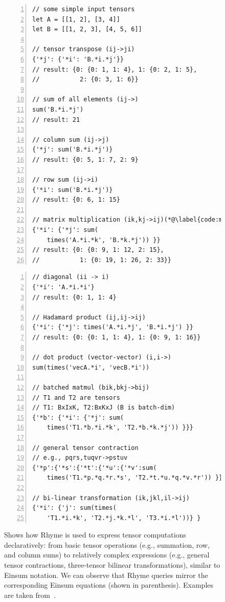 \documentclass[runningheads]{llncs}
\newcommand{\lang}{Rhyme}
\begin{document}

\begin{figure}[t]
\begin{minipage}{0.5\textwidth}
\begin{lstlisting}[style=JavaScript, columns=flexible, numbers=left]
// some simple input tensors
let A = [[1, 2], [3, 4]]
let B = [[1, 2, 3], [4, 5, 6]]

// tensor transpose (ij->ji)
{'*j': {'*i': 'B.*i.*j'}}
// result: {0: {0: 1, 1: 4}, 1: {0: 2, 1: 5},
//           2: {0: 3, 1: 6}}

// sum of all elements (ij->)
sum('B.*i.*j')
// result: 21

// column sum (ij->j)
{'*j': sum('B.*i.*j')}
// result: {0: 5, 1: 7, 2: 9}

// row sum (ij->i)
{'*i': sum('B.*i.*j')}
// result: {0: 6, 1: 15}

// matrix multiplication (ik,kj->ij)(*@\label{code:matmulquery}@*)
{'*i': {'*j': sum(
    times('A.*i.*k', 'B.*k.*j')) }}
// result: {0: {0: 9, 1: 12, 2: 15},
//           1: {0: 19, 1: 26, 2: 33}}
\end{lstlisting}
\end{minipage}
\begin{minipage}{0.5\textwidth}
\begin{lstlisting}[style=JavaScript, columns=flexible, numbers=left, firstnumber=last]
// diagonal (ii -> i)
{'*i': 'A.*i.*i'}
// result: {0: 1, 1: 4}

// Hadamard product (ij,ij->ij)
{'*i': {'*j': times('A.*i.*j', 'B.*i.*j') }}
// result: {0: {0: 1, 1: 4}, 1: {0: 9, 1: 16}}

// dot product (vector-vector) (i,i->)
sum(times('vecA.*i', 'vecB.*i'))

// batched matmul (bik,bkj->bij)
// T1 and T2 are tensors
// T1: BxIxK, T2:BxKxJ (B is batch-dim)
{'*b': {'*i': {'*j': sum(
    times('T1.*b.*i.*k', 'T2.*b.*k.*j')) }}}

// general tensor contraction
// e.g., pqrs,tuqvr->pstuv
{'*p':{'*s':{'*t':{'*u':{'*v':sum(
    times('T1.*p.*q.*r.*s', 'T2.*t.*u.*q.*v.*r')) }}}}}

// bi-linear transformation (ik,jkl,il->ij)
{'*i': {'j': sum(times(
    'T1.*i.*k', 'T2.*j.*k.*l', 'T3.*i.*l'))} }
\end{lstlisting}
\end{minipage}
\caption{
Shows how \lang{} is used to express tensor computations declaratively:
from basic tensor operations (e.g., summation, row, and column sums) to relatively complex expressions
(e.g., general tensor contractions, three-tensor bilinear transformations), similar
to Einsum notation.
We can observe that \lang{} queries
mirror the corresponding Einsum equations (shown in parenthesis).
Examples are taken from~\cite{einsumblog}.
}\label{fig:tensors}
\end{figure}
\end{document}

